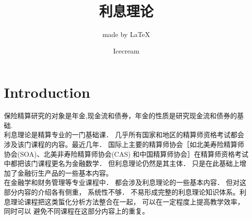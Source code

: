 \documentclass[cn,11pt,chinese,toc=twocol]{elegantbook}
\title{利息理论}
\subtitle{made by \LaTeX{} }
\author{Icecream}
\begin{document}
\def\angles#1{{%
		\vbox{\hrule height .2pt
			\kern 1pt
			\hbox{$\scriptstyle {#1}\kern 1pt$}%
		}\kern-.05pt \vrule width .2pt
}}
%
\maketitle
\tableofcontents

\chapter*{Introduction}
\noindent 保险精算研究的对象是年金,现金流和债券，年金的性质是研究现金流和债券的基础.\\
利息理论是精算专业的一门基础课． 几乎所有国家和地区的精算师资格考试都会涉及该门课程的内容。最近几年． 国际上主要的精算师协会［如北美寿险精算师协会(SOA)、北美非寿险精算师协会(CAS) 和中国精算师协会］在精算师资格考试中都把该门课程更名为金融数学． 但利息理论仍然是其主体． 只是在此基础上增加了金融衍生产品的一些基本内容。
\\在金融学和财务管理等专业课程中． 都会涉及利息理论的一些基本内容． 但对这部分内容的介绍各有侧重， 系统性不够． 不易形成完整的利息理论知识体系。利息理论课程把这类蜇化分析方法整合在一起， 可以在一定程度上提高教学效率， 同时可以
避免不同课程在这部分内容上的重复。







\end{document}

